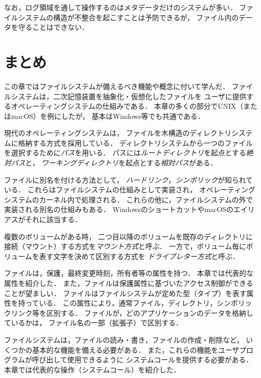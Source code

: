 なお，ログ領域を通して操作するのはメタデータだけのシステムが多い．
ファイルシステムの構造が不整合を起こすことは予防できるが，
ファイル内のデータを守ることはできない．

\section{まとめ}
この章ではファイルシステムが備えるべき機能や概念に付いて学んだ．
ファイルシステムは，二次記憶装置を抽象化・仮想化したファイルを
ユーザに提供するオペレーティングシステムの仕組みである．
本章の多くの部分でUNIX（またはmacOS）を例にしたが，
基本はWindows等でも共通である．

現代のオペレーティングシステムは，
ファイルを木構造のディレクトリシステムに格納する方式を採用している．
ディレクトリシステムから一つのファイルを選択するために\emph{パス}を用いる．
パスには\emph{ルートディレクトリ}を起点とする\emph{絶対パス}と，
\emph{ワーキングディレクトリ}を起点とする\emph{相対パス}がある．

ファイルに別名を付ける方法として，
\emph{ハードリンク}，\emph{シンボリック}が知られている．
これらはファイルシステムの仕組みとして実装され，
オペレーティングシステムのカーネル内で処理される．
これらの他に，ファイルシステムの外で実装される別名の仕組みもある．
WindowsのショートカットやmacOSのエイリアスがそれに該当する．

複数のボリュームがある時，
二つ目以降のボリュームを既存のディレクトリに
接続（マウント）する方式を\emph{マウント方式}と呼ぶ．
一方で，ボリューム毎にボリュームを表す文字を決めて区別する方式を
\emph{ドライブレター方式}と呼ぶ．

ファイルは，保護，最終変更時刻，所有者等の属性を持つ．
本章では代表的な属性を紹介した．
また，ファイルは保護属性に基づいたアクセス制御ができることが望ましい．
ファイルはファイルシステムが定めた型（タイプ）を表す属性を持っている．
この属性により，通常ファイル，ディレクトリ，シンボリックリンク等を区別する．
ファイルが，どのアプリケーションのデータを格納しているかは，
ファイル名の一部（拡張子）で区別する．

ファイルシステムは，ファイルの読み・書き，ファイルの作成・削除など，
いくつかの基本的な機能を備える必要がある．
また，これらの機能をユーザプログラムが呼び出して使用できるように
システムコールを提供する必要がある．
本章では代表的な操作（システムコール）を紹介した．

